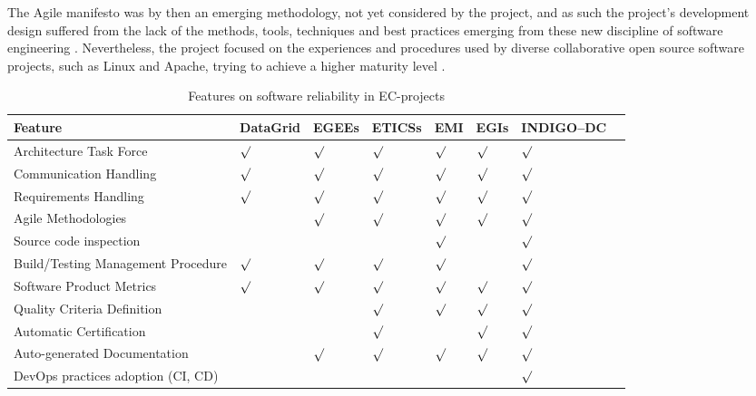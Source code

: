 \documentclass[journal]{IEEEtran}
\begin{document}
The Agile manifesto \cite{agile-manifesto} was by then an emerging methodology, not yet
considered by the project, and as such the project's
development design suffered from the lack of the methods, tools, techniques and best
practices emerging from these new discipline of software engineering
\cite{agile}. Nevertheless, the project focused on the experiences and procedures
used by diverse collaborative open source software projects, such as Linux and Apache, trying to
achieve a higher maturity level \cite{cmm}.

\begin{table}[!h]
\renewcommand{\arraystretch}{1.3}
\caption{Features on software reliability in EC-projects}
\label{tab:feat}
\centering
\begin{adjustbox}{max width=0.5\textwidth}
\begin{tabular}{llllllll}
\hline
\hline
Feature & DataGrid & EGEEs & ETICSs & EMI & EGIs & INDIGO--DC\\
\hline
\hline
Architecture Task Force&$\surd$&$\surd$&$\surd$&$\surd$&$\surd$&$\surd$\\
Communication Handling&$\surd$&$\surd$&$\surd$&$\surd$&$\surd$&$\surd$\\
Requirements Handling&$\surd$&$\surd$&$\surd$&$\surd$&$\surd$&$\surd$\\
Agile Methodologies&&$\surd$&$\surd$&$\surd$&$\surd$&$\surd$\\
Source code inspection&&&&$\surd$&&$\surd$\\
Build/Testing Management Procedure&$\surd$&$\surd$&$\surd$&$\surd$&&$\surd$\\
Software Product Metrics&$\surd$&$\surd$&$\surd$&$\surd$&$\surd$&$\surd$\\
Quality Criteria Definition&&&$\surd$&$\surd$&$\surd$&$\surd$\\
Automatic Certification&&&$\surd$&&$\surd$&$\surd$\\
Auto-generated Documentation&&$\surd$&$\surd$&$\surd$&$\surd$&$\surd$\\
DevOps practices adoption (CI, CD)&&&&&&$\surd$\\
\hline
\hline
\end{tabular}
\end{adjustbox}
\end{table}
\end{document}
